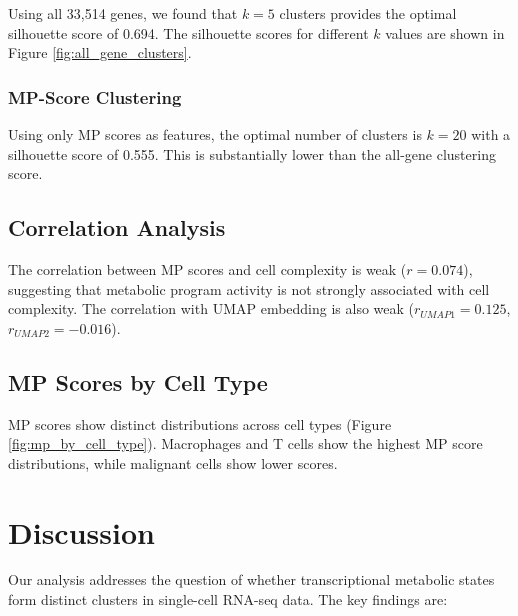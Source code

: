 \documentclass[11pt,a4paper]{article}
\begin{document}
Using all 33,514 genes, we found that $k=5$ clusters provides the optimal silhouette score of 0.694. The silhouette scores for different $k$ values are shown in Figure \ref{fig:all_gene_clusters}.

\subsubsection{MP-Score Clustering}

Using only MP scores as features, the optimal number of clusters is $k=20$ with a silhouette score of 0.555. This is substantially lower than the all-gene clustering score.

\subsection{Correlation Analysis}

The correlation between MP scores and cell complexity is weak ($r = 0.074$), suggesting that metabolic program activity is not strongly associated with cell complexity. The correlation with UMAP embedding is also weak ($r_{UMAP1} = 0.125$, $r_{UMAP2} = -0.016$).

\subsection{MP Scores by Cell Type}

MP scores show distinct distributions across cell types (Figure \ref{fig:mp_by_cell_type}). Macrophages and T cells show the highest MP score distributions, while malignant cells show lower scores.

\section{Discussion}

Our analysis addresses the question of whether transcriptional metabolic states form distinct clusters in single-cell RNA-seq data. The key findings are:
\end{document}
